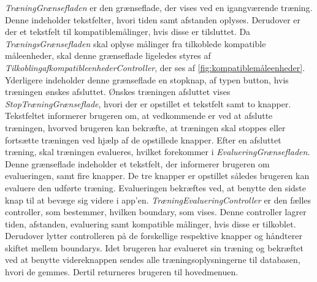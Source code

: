 \noindent
\textit{TræningGrænsefladen} er den grænseflade, der vises ved en igangværende træning. Denne indeholder tekstfelter, hvori tiden samt afstanden oplyses. Derudover er der et tekstfelt til kompatiblemålinger, hvis disse er tilsluttet. Da \textit{TræningsGrænsefladen} skal oplyse målinger fra tilkoblede kompatible måleenheder, skal denne grænseflade ligeledes styres af \textit{TilkoblingafkompatibleenhederController}, der ses af \autoref{fig:kompatiblemåleenheder}. Yderligere indeholder denne grænseflade en stopknap, af typen button, hvis træningen ønskes afsluttet. 
Ønskes træningen afsluttet vises \textit{StopTræningGrænseflade}, hvori der er opstillet et tekstfelt samt to knapper. Tekstfeltet informerer brugeren om, at vedkommende er ved at afslutte træningen, hvorved brugeren kan bekræfte, at træningen skal stoppes eller fortsætte træningen ved hjælp af de opstillede knapper. 
Efter en afsluttet træning, skal træningen evalueres, hvilket forekommer i \textit{EvalueringGrænsefladen}. Denne grænseflade indeholder et tekstfelt, der informerer brugeren om evalueringen, samt fire knapper. De tre knapper er opstillet således brugeren kan evaluere den udførte træning. Evalueringen bekræftes ved, at benytte den sidste knap til at bevæge sig videre i app’en. 
\textit{TræningEvalueringController} er den fælles controller, som bestemmer, hvilken boundary, som vises. Denne controller lagrer tiden, afstanden, evaluering samt kompatible målinger, hvis disse er tilkoblet. Derudover lytter controlleren på de forskellige respektive knapper og håndterer skiftet mellem boundarys. Idet brugeren har evalueret sin træning og bekræftet ved at benytte videreknappen sendes alle træningsoplysningerne til databasen, hvori de gemmes. Dertil returneres brugeren til hovedmenuen. 
